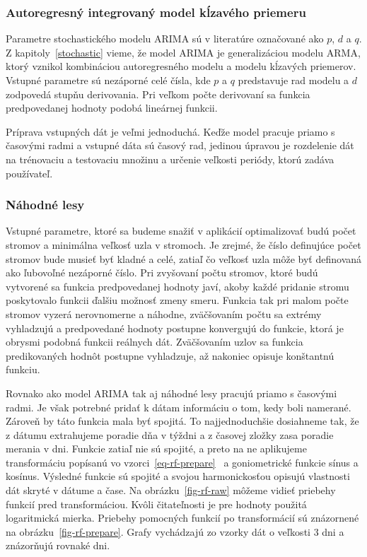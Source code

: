 \documentclass[a4paper,slovak,12pt,appendix]{article}
\begin{document}
\subsubsection{Autoregresný integrovaný model kĺzavého priemeru}
Parametre stochastického modelu ARIMA sú v literatúre označované ako $p$, $d$
a $q$. Z kapitoly~\ref{stochastic} vieme, že model ARIMA je generalizáciou
modelu ARMA, ktorý vznikol kombináciou autoregresného modelu a modelu
kĺzavých priemerov. Vstupné parametre sú nezáporné celé čísla, kde $p$ a $q$
predstavuje rad modelu a $d$ zodpovedá stupňu derivovania. Pri veľkom počte
derivovaní sa funkcia predpovedanej hodnoty podobá lineárnej funkcii.

Príprava vstupných dát je veľmi jednoduchá. Keďže model pracuje priamo
s časovými radmi a vstupné dáta sú časový rad, jedinou úpravou je rozdelenie dát
na trénovaciu a testovaciu množinu a určenie veľkosti periódy, ktorú zadáva
používateľ.

\subsubsection{Náhodné lesy}
Vstupné parametre, ktoré sa budeme snažiť v aplikácií optimalizovať budú počet
stromov a minimálna veľkosť uzla v stromoch. Je zrejmé, že číslo definujúce
počet stromov bude musieť byť kladné a celé, zatiaľ čo veľkosť uzla môže byť
definovaná ako ľubovoľné nezáporné číslo. Pri zvyšovaní počtu stromov, ktoré
budú vytvorené sa funkcia predpovedanej hodnoty javí, akoby každé pridanie stromu
poskytovalo funkcii ďalšiu možnosť zmeny smeru. Funkcia tak pri malom počte
stromov vyzerá nerovnomerne a náhodne, zväčšovaním počtu sa extrémy vyhladzujú a
predpovedané hodnoty postupne konvergujú do funkcie, ktorá je obrysmi podobná
funkcii reálnych dát. Zväčšovaním uzlov sa funkcia predikovaných hodnôt
postupne vyhladzuje, až nakoniec opisuje konštantnú funkciu.

Rovnako ako model ARIMA tak aj náhodné lesy pracujú priamo s časovými radmi.
Je však potrebné pridať k dátam informáciu o tom, kedy boli namerané. Zároveň
by táto funkcia mala byť spojitá. To najjednoduchšie dosiahneme tak, že z dátumu
extrahujeme poradie dňa v týždni a z časovej zložky zasa poradie merania v dni.
Funkcie zatiaľ nie sú spojité, a preto na ne aplikujeme transformáciu popísanú
vo vzorci~\ref{eq-rf-prepare}~\cite{Laurinec2017} a goniometrické funkcie sínus
a kosínus. Výsledné funkcie sú spojité a svojou
harmonickosťou opisujú vlastnosti dát skryté v dátume a čase. Na
obrázku~\ref{fig-rf-raw} môžeme vidieť priebehy funkcií pred transformáciou.
Kvôli čitateľnosti je pre hodnoty použitá logaritmická mierka. Priebehy
pomocných funkcií po transformácií sú znázornené na obrázku~\ref{fig-rf-prepare}.
Grafy vychádzajú zo vzorky dát o veľkosti 3 dni a znázorňujú rovnaké dni.
\end{document}

